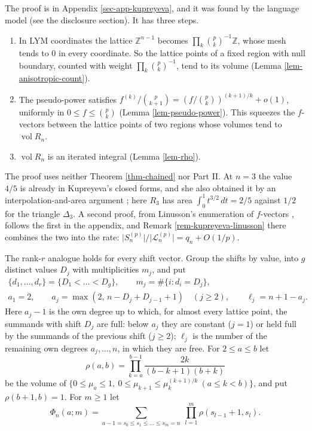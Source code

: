 \documentclass[11pt, a4paper, abstract=yes]{scrartcl}
\theoremstyle{definition}
\theoremstyle{remark}
\theoremstyle{plain}
\theoremstyle{remark}
\theoremstyle{plain}
\newcommand{\vol}{\operatorname{vol}}
\let\autocite\cite
\begin{document}
The proof is in Appendix \ref{sec-app-kupreyeva}, and it was found by the language model (see the
disclosure section). It has three steps.
\begin{enumerate}
\item In LYM coordinates the lattice \(\mathbb Z^{n-1}\) becomes \(\prod_k\binom pk^{-1}\mathbb Z\),
whose mesh tends to \(0\) in every coordinate. So the lattice points of a fixed region with null
boundary, counted with weight \(\prod_k\binom pk^{-1}\), tend to its volume
(Lemma \ref{lem-anisotropic-count}).
\item The pseudo-power satisfies \(f^{(k)}/\binom p{k+1}=(f/\binom pk)^{(k+1)/k}+o(1)\), uniformly in
\(0\le f\le\binom pk\) (Lemma \ref{lem-pseudo-power}). This squeezes the \(f\)-vectors between the
lattice points of two regions whose volumes tend to \(\vol R_n\).
\item \(\vol R_n\) is an iterated integral (Lemma \ref{lem-rho}).
\end{enumerate}

The proof uses neither Theorem \ref{thm-chained} nor Part II. At \(n=3\) the value \(4/5\) is already
in Kupreyeva's closed forms, and she also obtained it by an interpolation-and-area argument
\autocite[Section 4.1]{Kupreyeva2019}; here \(R_3\) has area \(\int_0^1t^{3/2}\,dt=2/5\) against \(1/2\) for
the triangle \(\Delta_3\). A second proof, from Linusson's enumeration of \(f\)-vectors
\autocite{Linusson1999}, follows the first in the appendix, and Remark \ref{rem-kupreyeva-linusson} there
combines the two into the rate: \(\lvert S_n^{(p)}\rvert/\lvert\mathcal L_n^{(p)}\rvert=q_n+O(1/p)\).

The rank-\(r\) analogue holds for every shift vector. Group the shifts by value, into \(g\)
distinct values \(D_j\) with multiplicities \(m_j\), and put
\begin{equation}\label{eq:aj}
\begin{gathered}
  \lbrace d_1,\dots,d_r\rbrace=\lbrace D_1<\dots<D_g\rbrace,\qquad m_j=\#\lbrace i:d_i=D_j\rbrace,\\
  a_1=2,\qquad a_j=\max(2,\,n-D_j+D_{j-1}+1)\quad(j\ge2),\qquad \ell_j=n+1-a_j .
\end{gathered}
\end{equation}
Here \(a_j-1\) is the own degree up to which, for almost every lattice point, the summands with shift
\(D_j\) are full: below \(a_j\) they are constant (\(j=1\)) or held full by the summands of the
previous shift (\(j\ge2\)); \(\ell_j\) is the number of the remaining own degrees
\(a_j,\dots,n\), in which they are free. For \(2\le a\le b\) let
\begin{equation}\label{eq:rho}
  \rho(a,b)=\prod_{k=a}^{b-1}\frac{2k}{(b-k+1)(b+k)}
\end{equation}
be the volume of \(\lbrace0\le\mu_a\le1,\ 0\le\mu_{k+1}\le\mu_k^{(k+1)/k}\ (a\le k<b)\rbrace\), and
put \(\rho(b+1,b)=1\). For \(m\ge1\) let
\begin{equation}\label{eq:Phi}
  \Phi_n(a;m)=\sum_{a-1=s_0\le s_1\le\dots\le s_m=n}\ \prod_{l=1}^m\rho(s_{l-1}+1,s_l) .
\end{equation}
\end{document}
